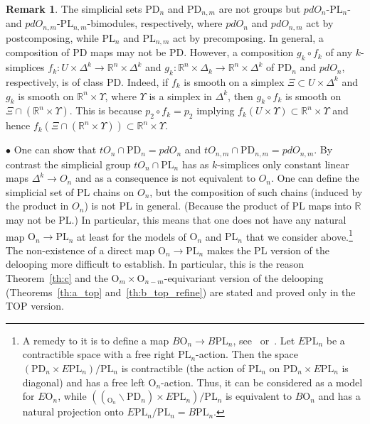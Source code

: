 \documentclass[11pt]{amsart}
\theoremstyle{definition}
\newtheorem{remark}[theorem]{Remark}
\newcommand{\R}{{\mathbb R}}
\newcommand{\PL}{\mathrm{PL}}
\newcommand{\OO}{\mathrm{O}}
\newcommand{\PD}{\mathrm{PD}}
\numberwithin{equation}{section}
\begin{document}
\begin{remark}\label{r:pd}
The simplicial sets $\PD_n$ and $\PD_{n,m}$ are not groups but $pdO_n$-$\PL_n$- and $pdO_{n,m}$-$\PL_{n,m}$-bimodules, respectively, where $pdO_n$ and $pdO_{n,m}$
act  by postcomposing, while $\PL_n$ and $\PL_{n,m}$ act by precomposing. In general, a composition of PD maps may not be PD. However, a composition $g_k\circ f_k$ of any $k$-simplices $f_k\colon U\times \Delta^k\to\R^n\times \Delta^k$
and $g_k\colon\R^n\times\Delta_k\to\R^n\times\Delta^k$ of $\PD_n$ and $pdO_n$, respectively, is of class PD. Indeed, if $f_k$ is smooth on a simplex $\Xi\subset U\times\Delta^k$ and $g_k$ is smooth on $\R^n\times\Upsilon$, where $\Upsilon$ is a simplex in $\Delta^k$, then $g_k\circ f_k$ is smooth
on $\Xi\cap(\R^n\times\Upsilon)$. This is because $p_2\circ f_k=p_2$ 
 implying $f_k(U\times\Upsilon)\subset \R^n\times\Upsilon$
and hence  $f_k\left(\Xi\cap(\R^n\times\Upsilon)\right)\subset  \R^n\times\Upsilon$.
\end{remark}


$\bullet$ One can show that $tO_n\cap\PD_n=pdO_n$ and $tO_{n,m}\cap\PD_{n,m}=pdO_{n,m}$. %
 By contrast the simplicial group  $tO_n\cap \PL_n$ has as $k$-simplices only constant linear maps $\Delta^k\to O_n$ and as a consequence is not equivalent
to $O_n$. One can define the simplicial set of PL chains on $O_n$, but the composition of such chains (induced by the product in $O_n$) is not PL in general. (Because the product of PL maps into %
 $\R$ may not be PL.) In particular, this means that one does not have any natural map $\OO_n\to \PL_n$ at least for the models of $\OO_n$ and $\PL_n$ that 
we consider above.\footnote{A remedy to it  is to define a map $B\OO_n\to B\PL_n$, see~\cite[Lemma~3.3]{LR} or~\cite[Equation~(6.1)]{HirschMazur}. Let $E\PL_n$ be a contractible space with a free
right $\PL_n$-action. Then the space $(\PD_n \times E\PL_n)/\PL_n$ is contractible (the action of $\PL_n$ on $\PD_n\times E\PL_n$ is diagonal) and has a free
left $\OO_n$-action. Thus, it can be considered as a model for $E\OO_n$, while $\left(\left(_{\OO_n}\!\!{\backslash}\PD_n\right)\times E\PL_n\right)/\PL_n$
is equivalent to $B\OO_n$ and has a natural projection onto $E\PL_n/\PL_n=B\PL_n$.\label{foot10}} The non-existence of a direct map $\OO_n\to\PL_n$
makes the PL version of the delooping more difficult to establish. In particular, this is the reason Theorem~\ref{th:c} and the $\OO_m\times\OO_{n-m}$-equivariant
version of the delooping (Theorems~\ref{th:a_top} and~\ref{th:b_top_refine})  are stated and proved only in the TOP version.
\end{document}
